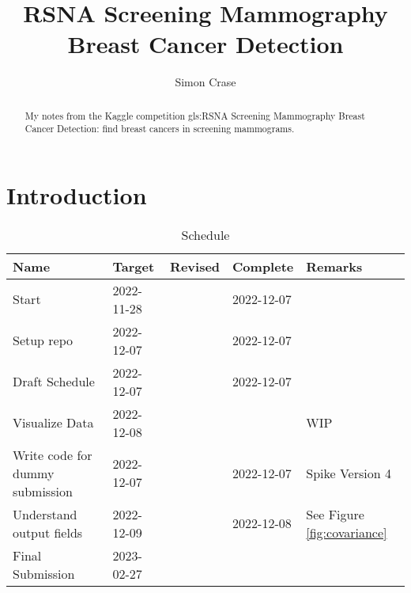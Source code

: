 \documentclass[]{article}
\title{RSNA Screening Mammography Breast Cancer Detection}
\author{Simon Crase}
\begin{document}
\maketitle

\begin{abstract}
My notes from the Kaggle competition \gls{gls:RSNA} Screening Mammography Breast Cancer Detection: find breast cancers in screening mammograms. \cite{rsna-breast-cancer-detection}
\end{abstract}

\setcounter{tocdepth}{2}
\tableofcontents
\listoffigures
\listoftables

\section{Introduction}
\begin{table}[H]
	\begin{center}
		\caption{Schedule}
		\begin{tabular}{|l|l|l|l|l|} \hline
			Name&Target&Revised&Complete&Remarks \\  \hline
			Start&2022-11-28&&2022-12-07&\\ 		 \hline
			Setup repo&2022-12-07&&2022-12-07&\\ 		 \hline
			Draft Schedule&2022-12-07&&2022-12-07&\\ 		 \hline
			Visualize Data&2022-12-08&&&WIP\\ 		 \hline
			Write code for dummy submission&2022-12-07&&2022-12-07&Spike Version 4\\ 		 \hline
			Understand output fields&2022-12-09&&2022-12-08&See Figure \ref{fig:covariance}\\ \hline
			Final Submission&2023-02-27&&&\\ 		 \hline
		\end{tabular}
	\end{center}
\end{table}
\end{document}

